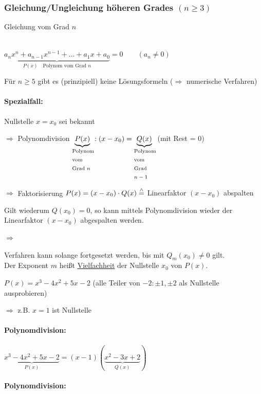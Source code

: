 \subsubsection{Gleichung/Ungleichung höheren Grades $(n\ge 3)$}
\begin{enumerate}[A)]
	{\bf \item Gleichung vom Grad $n$}\\
	$\underbrace{a_nx^n+a_{n-1}x^{n-1}+\ldots+a_1x+a_0}_{P(x)\quad\text{Polynom vom Grad }n} = 0\qquad (a_n\ne0)$
	
	\Bem Für $n\ge5$ gibt es (prinzipiell) keine Lösungsformeln ($\Rightarrow$ numerische Verfahren)
	
	\paragraph{Spezialfall:} Nullstelle $x=x_0$ sei bekannt
	
	$\Rightarrow$ Polynomdivision $\underbrace{P(x)}_\text{\parbox{1cm}{Polynom vom Grad $n$}}:(x-x_0) = \underbrace{Q(x)}_\text{\parbox{1cm}{Polynom vom Grad $n-1$}}$ (mit Rest = 0)
	
	$\Rightarrow$ Faktorisierung $P(x)=(x-x_0)\cdot Q(x) \stackrel{\wedge}{=}$ {\flqq Linearfaktor $(x-x_0)$ abspalten\frqq}
	
	Gilt wiederum $Q(x_0) = 0$, so kann mittels Polynomdivision wieder der Linearfaktor $(x-x_0)$ abgespalten werden.
	
	
	$\Rightarrow$ 
	
	Verfahren kann solange fortgesetzt werden, bis  mit $Q_m(x_0) \ne0$ gilt.\\
	Der Exponent $m$ heißt \ul{Vielfachheit} der Nullstelle $x_0$ von $P(x)$.
	
	\clearpage
	\Bsp $P(x)=x^3-4x^2+5x-2$ (alle Teiler von $-2:\pm1,\pm2$ als Nullstelle ausprobieren)
	
	$\Rightarrow$ z.B. $x=1$ ist Nullstelle
	
	\paragraph{Polynomdivision:}
	
	$\underbrace{x^3-4x^2+5x-2}_{P(x)}=(x-1)(\underbrace{x^2-3x+2}_{Q(x)})$
	
	\paragraph{Polynomdivision:}
	

\end{enumerate}
